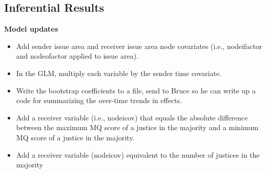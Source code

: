 \documentclass[headsepline=true, abstracton]{scrartcl}
\begin{document}
\newpage 



  
\subsection{Inferential Results}


\textbf{Model updates}
\begin{itemize}
\item Add sender issue area and receiver issue area node covariates (i.e., nodeifactor and nodeofactor applied to issue area). 
\item In the GLM, multiply each variable by the sender time covariate.
\item Write the bootstrap coefficients to a file, send to Bruce so he can write up a code for summarizing the over-time trends in effects.
\item Add a receiver variable (i.e., nodeicov) that equals the absolute difference between the maximum MQ score of a justice in the majority and a minimum MQ score of a justice in the majority.
\item Add a receiver variable (nodeicov) equivalent to the number of justices in the majority
 
\end{itemize}
\end{document}
